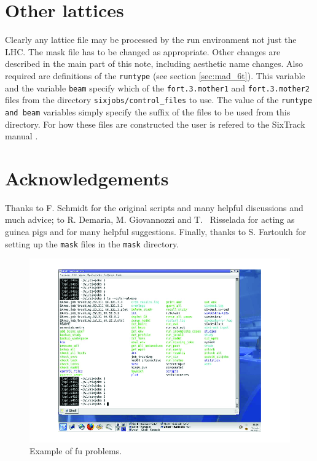 \documentclass{article}    %
\begin{document}
\section{Other lattices}
\label{sec:otherlattices}

Clearly any lattice file may be processed by the run environment not
just the LHC. The mask file has to be changed as appropriate.
Other changes are described in the main part of this
note, including aesthetic name changes. Also required are definitions
of the {\tt runtype} (see section \ref{sec:mad_6t}). This variable
and the variable {\tt beam} specify which of the {\tt fort.3.mother1} and {\tt fort.3.mother2}
files from the directory {\tt sixjobs/control\_files}
to use. The value of the {\tt runtype and beam} variables simply specify the suffix
of the files to be used from this directory. For how these files are
constructed the user is refered to the SixTrack manual \cite{SixTrack}.
\section{Acknowledgements}
Thanks to F. Schmidt for the original scripts and many helpful discussions
and much advice; to R. Demaria, M. Giovannozzi and T. ~Risselada
for acting as guinea pigs and for many helpful suggestions.
Finally, thanks to S. Fartoukh for setting up the {\tt mask} files in
the {\tt mask} directory.

\begin{figure}[tb]
\centering
\includegraphics*[width=200mm]{print}
\caption{Example of fu problems.}
\label{dir}
\end{figure}
\end{document}
